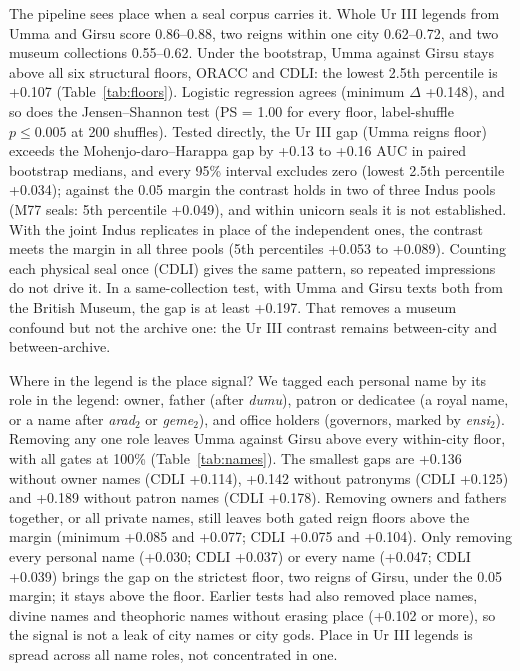 \documentclass[11pt,a4paper]{article}
\begin{document}
The pipeline sees place when a seal corpus carries it.
Whole Ur III legends from Umma and Girsu score 0.86--0.88, two reigns within one city 0.62--0.72, and two museum collections 0.55--0.62. %
Under the bootstrap, Umma against Girsu stays above all six structural floors, ORACC and CDLI: the lowest 2.5th percentile is +0.107 (Table~\ref{tab:floors}). %
Logistic regression agrees (minimum $\Delta$ +0.148), and so does the Jensen--Shannon test (PS = 1.00 for every floor, label-shuffle $p \leq 0.005$ at 200 shuffles). %
Tested directly, the Ur III gap (Umma reigns floor) exceeds the Mohenjo-daro--Harappa gap by +0.13 to +0.16 AUC in paired bootstrap medians, and every 95\% interval excludes zero (lowest 2.5th percentile +0.034); against the 0.05 margin the contrast holds in two of three Indus pools (M77 seals: 5th percentile +0.049), and within unicorn seals it is not established. %
With the joint Indus replicates in place of the independent ones, the contrast meets the margin in all three pools (5th percentiles +0.053 to +0.089). %
Counting each physical seal once (CDLI) gives the same pattern, so repeated impressions do not drive it. %
In a same-collection test, with Umma and Girsu texts both from the British Museum, the gap is at least +0.197. %
That removes a museum confound but not the archive one: the Ur III contrast remains between-city and between-archive.

Where in the legend is the place signal?
We tagged each personal name by its role in the legend: owner, father (after \emph{dumu}), patron or dedicatee (a royal name, or a name after \emph{arad$_2$} or \emph{geme$_2$}), and office holders (governors, marked by \emph{ensi$_2$}). %
Removing any one role leaves Umma against Girsu above every within-city floor, with all gates at 100\% (Table~\ref{tab:names}). %
The smallest gaps are +0.136 without owner names (CDLI +0.114), +0.142 without patronyms (CDLI +0.125) and +0.189 without patron names (CDLI +0.178). %
Removing owners and fathers together, or all private names, still leaves both gated reign floors above the margin (minimum +0.085 and +0.077; CDLI +0.075 and +0.104). %
Only removing every personal name (+0.030; CDLI +0.037) or every name (+0.047; CDLI +0.039) brings the gap on the strictest floor, two reigns of Girsu, under the 0.05 margin; it stays above the floor. %
Earlier tests had also removed place names, divine names and theophoric names without erasing place (+0.102 or more), so the signal is not a leak of city names or city gods. %
Place in Ur III legends is spread across all name roles, not concentrated in one.
\end{document}
